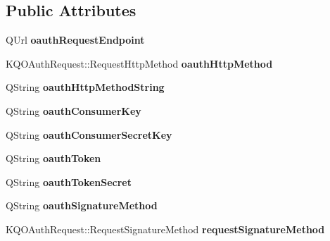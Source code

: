 \subsection*{Public Attributes}
\begin{DoxyCompactItemize}
\item 
\mbox{\label{class_k_q_o_auth_request_private_a8cf4f6d7db34244f006b5f23e42032c7}} 
Q\+Url {\bfseries oauth\+Request\+Endpoint}
\item 
\mbox{\label{class_k_q_o_auth_request_private_a08e2828e44d39ef3d87aa7e8b35d7c25}} 
K\+Q\+O\+Auth\+Request\+::\+Request\+Http\+Method {\bfseries oauth\+Http\+Method}
\item 
\mbox{\label{class_k_q_o_auth_request_private_a4dda7c6db87f3f571f67aefdb96d016a}} 
Q\+String {\bfseries oauth\+Http\+Method\+String}
\item 
\mbox{\label{class_k_q_o_auth_request_private_aaf561e031ebe2818278283ee6aefc0e2}} 
Q\+String {\bfseries oauth\+Consumer\+Key}
\item 
\mbox{\label{class_k_q_o_auth_request_private_a151a2aec16b73e742ecd08ccb565c9b4}} 
Q\+String {\bfseries oauth\+Consumer\+Secret\+Key}
\item 
\mbox{\label{class_k_q_o_auth_request_private_a7dac0c11d555a809c233d5c8ec746340}} 
Q\+String {\bfseries oauth\+Token}
\item 
\mbox{\label{class_k_q_o_auth_request_private_a9ab3d825b604cc6a8463fa76703da1bc}} 
Q\+String {\bfseries oauth\+Token\+Secret}
\item 
\mbox{\label{class_k_q_o_auth_request_private_a168421512ee53418036528fbfb01f4bd}} 
Q\+String {\bfseries oauth\+Signature\+Method}
\item 
\mbox{\label{class_k_q_o_auth_request_private_ac0e8e28d5d52f3eb5f75676160da3126}} 
K\+Q\+O\+Auth\+Request\+::\+Request\+Signature\+Method {\bfseries request\+Signature\+Method}

\end{DoxyCompactItemize}
